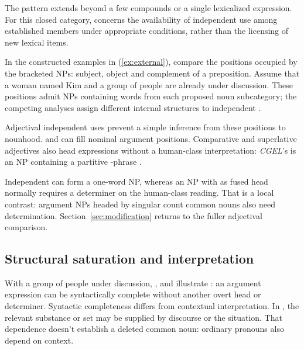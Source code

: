 \documentclass[12pt]{article}
\begin{document}
The pattern extends beyond a few compounds or a single lexicalized expression. For this closed category,  concerns the availability of independent use among established members under appropriate conditions, rather than the licensing of new lexical items.

In the constructed examples in (\ref{ex:external}), compare the positions occupied by the bracketed NPs: subject, object and complement of a preposition. Assume that a woman named Kim and a group of people are already under discussion. These positions admit NPs containing words from each proposed noun subcategory; the competing analyses assign different internal structures to independent .

\begin{samepage}
\ea\label{ex:external}
\ea {}\qquad {}\qquad {}
\ex {}\qquad {}\qquad {}
\ex {}\qquad {}\qquad {}
\ex {}\qquad {}\qquad {}
\z\z
\end{samepage}

Adjectival independent uses prevent a simple inference from these positions to nounhood.  and  can fill nominal argument positions. Comparative and superlative adjectives also head expressions without a human-class interpretation: \textit{CGEL}'s  is an NP containing a partitive -phrase \citep[332--333, 416--423]{huddleston2002}.

Independent  can form a one-word NP, whereas an NP with  as fused head normally requires a determiner on the human-class reading. That is a local contrast: argument NPs headed by singular count common nouns also need determination. Section~\ref{sec:modification} returns to the fuller adjectival comparison.

\subsection{Structural saturation and interpretation}

With a group of people under discussion, ,  and  illustrate : an argument expression can be syntactically complete without another overt head or determiner. Syntactic completeness differs from contextual interpretation. In , the relevant substance or set may be supplied by discourse or the situation. That dependence doesn't establish a deleted common noun: ordinary pronouns also depend on context.
\end{document}
